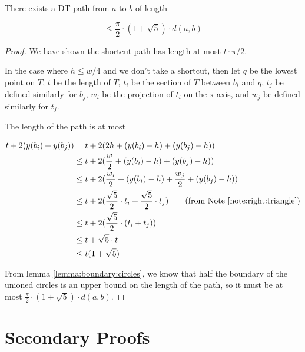 \documentclass{tufte-handout}
\begin{document}
\begin{Theorem}

  There exists a DT path from $a$ to $b$ of length

  \begin{displaymath}
    \le \frac{\pi}{2} \cdot (1 + \sqrt{5}) \cdot d(a,b)
  \end{displaymath}

\end{Theorem}

\begin{proof}

  We have shown the shortcut path has length at most $t \cdot \pi /
  2$.

  In the case where $h \le w/4$ and we don't take a shortcut, then let
  $q$ be the lowest point on $T$, $t$ be the length of $T$, $t_i$ be
  the section of $T$ between $b_i$ and $q$, $t_j$ be defined similarly
  for $b_j$, $w_i$ be the projection of $t_i$ on the x-axis, and $w_j$
  be defined similarly for $t_j$.

  The length of the path is at most

  \begin{align*}
    t + 2(y(b_i) + y(b_j)) &= t + 2(2h + (y(b_i) - h) + (y(b_j) - h)) \\
    &\le t + 2(\frac{w}{2} + (y(b_i) - h) + (y(b_j) - h)) \\
    &\le t + 2(\frac{w_i}{2} + (y(b_i) - h) + \frac{w_j}{2} + (y(b_j) - h)) \\
    &\le t + 2(\frac{\sqrt{5}}{2} \cdot t_i + \frac{\sqrt{5}}{2} \cdot t_j)
    \tag{from Note \ref{note:right:triangle}} \\
    &\le t + 2(\frac{\sqrt{5}}{2} \cdot (t_i + t_j)) \\
    &\le t + \sqrt{5} \cdot t \\
    &\le t (1 + \sqrt{5})
  \end{align*}

  From lemma \ref{lemma:boundary:circles}, we know that half the
  boundary of the unioned circles is an upper bound on the length of
  the path, so it must be at most $\frac{\pi}{2} \cdot (1 + \sqrt{5})
  \cdot d(a,b)$.

\end{proof}

\newpage

\section{Secondary Proofs}
\end{document}
